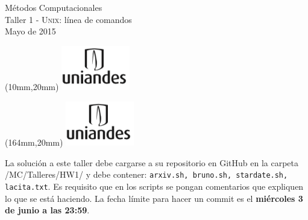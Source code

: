 \documentclass[11pt,letterpaper]{exam}
\begin{document}
\begin{center}
{\Large Métodos Computacionales} \\
Taller 1 - \textsc{Unix}: línea de comandos \\
Mayo de 2015
\end{center}

\begin{textblock*}{40mm}(10mm,20mm)
  \includegraphics[width=3cm]{logoUniandes.png}
\end{textblock*}

\begin{textblock*}{40mm}(164mm,20mm)
  \includegraphics[width=3cm]{logoUniandes.png}
\end{textblock*}

\vspace{0.5cm}

La solución a este taller debe cargarse a su repositorio en GitHub en la carpeta /MC/Talleres/HW1/ y debe contener: \verb+arxiv.sh, bruno.sh, stardate.sh, lacita.txt+. Es requisito que en los scripts se pongan comentarios que expliquen lo que se está haciendo. La fecha límite para hacer un commit es el \textbf{miércoles 3 de junio a las 23:59}.

\vspace{0.5cm}
\end{document}
